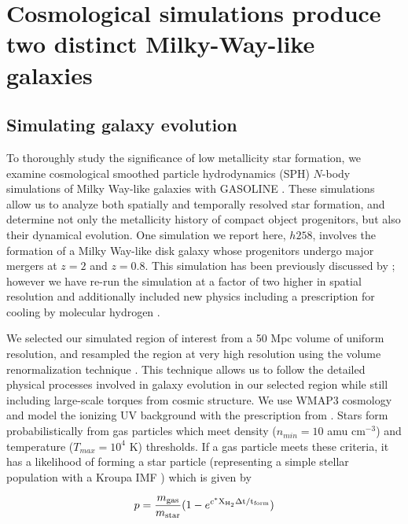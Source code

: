\documentclass[nofootinbib,twocolumn,prd]{emulateapj}
\begin{document}
\section{Cosmological simulations produce two distinct Milky-Way-like galaxies}
\label{sec:sims}

\subsection{Simulating galaxy evolution}
To thoroughly study the significance of low metallicity star
formation, we examine cosmological smoothed particle hydrodynamics
(SPH) $N$-body simulations of Milky Way-like galaxies with GASOLINE
\citep{2001PhDT........21S,2004NewA....9..137W}.  These simulations allow us to analyze both
spatially and temporally resolved star formation, and determine not
only the metallicity history of compact object progenitors, but also
their dynamical evolution.  
One simulation we report here, $h258$,
involves the formation of a Milky Way-like disk galaxy whose
progenitors undergo major mergers at $z = 2$ and $z = 0.8$.  This
simulation has been previously discussed by
\citet{2009MNRAS.398..312G,2010ApJ...721L.148B,2011ApJ...742...13B,2011ApJ...728...51B}; however we have
re-run the simulation at a factor of two higher in spatial resolution
and additionally included new physics including a prescription for
cooling by molecular hydrogen \citet{2012MNRAS.425.3058C}.

We selected our simulated region of interest from a 50 Mpc volume of
uniform resolution, and resampled the region at very high
resolution using the volume renormalization technique \citep{1993ApJ...412..455K}.
This technique allows us to follow the detailed physical processes
involved in galaxy evolution in our selected region while still
including large-scale torques from cosmic structure.  We use
WMAP3 cosmology \citep{WMAP} and model the ionizing UV background
with the prescription from \citet{1996ApJ...461...20H}.  Stars form
probabilistically from gas particles which meet density ($n_{min} =
10$ amu cm$^{-3}$) and temperature ($T_{max} = 10^4$ K) thresholds. If a gas
particle meets these criteria, it has a likelihood of forming a star
particle (representing a simple stellar population with a Kroupa IMF
\citep{2001MNRAS.322..231K}) which is given by

\begin{equation}
p = \frac{m_{\rm gas}}{m_{\rm star}} (1 - e^{c^*\rm X_{\rm H_2} \Delta t/t_{\rm form}})
\end{equation}
\end{document}
